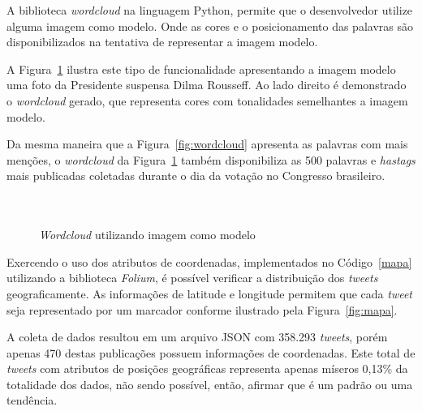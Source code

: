 A biblioteca \textit{wordcloud} na linguagem Python, permite que o desenvolvedor utilize alguma imagem como modelo. Onde as cores e o posicionamento das palavras são disponibilizados na tentativa de representar a imagem modelo.

A Figura~\ref{fig:worddilma} ilustra este tipo de funcionalidade apresentando a imagem modelo uma foto da Presidente suspensa Dilma Rousseff. Ao lado direito é demonstrado o \textit{wordcloud} gerado, que representa cores com tonalidades semelhantes a imagem modelo.

Da mesma maneira que a Figura~\ref{fig:wordcloud} apresenta as palavras com mais menções, o \textit{wordcloud} da Figura~\ref{fig:worddilma} também disponibiliza as 500 palavras e \textit{hastags} mais publicadas coletadas durante o dia da votação no Congresso brasileiro. \\ \\ \\

\begin{figure}[h]
	\centering
	\caption{\textit{Wordcloud} utilizando imagem como modelo}
	\vspace{-0.3cm}
	\label{fig:worddilma}
\end{figure}

Exercendo o uso dos atributos de coordenadas, implementados no Código~\ref{mapa} utilizando a biblioteca \textit{Folium}, é possível verificar a distribuição dos \textit{tweets} geograficamente. As informações de latitude e longitude permitem que cada \textit{tweet} seja representado por um marcador conforme ilustrado pela Figura~\ref{fig:mapa}.

A coleta de dados resultou em um arquivo JSON com 358.293 \textit{tweets}, porém apenas 470 destas publicações possuem informações de coordenadas. Este total de \textit{tweets} com atributos de posições geográficas representa apenas míseros 0,13\% da totalidade dos dados, não sendo possível, então, afirmar que é um padrão ou uma tendência.

